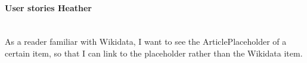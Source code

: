 \paragraph{User stories Heather} ~\\
As a reader familiar with Wikidata, I want to see the ArticlePlaceholder of a certain item, so that I can link to the placeholder rather than the Wikidata item. \\
